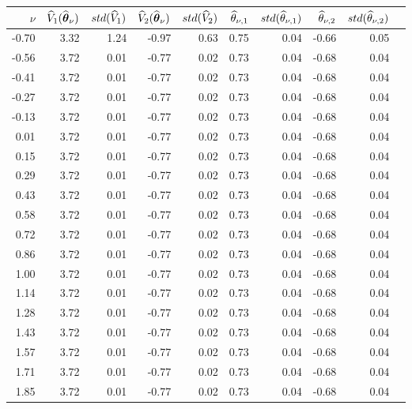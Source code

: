 \begin{tabular}{rrrrrrrrrr}\hline 
 $\nu$  & $\widehat{V}_1(\widehat{\boldsymbol{\theta}}_{\nu})$ & $std(\widehat{V}_1)$ & $\widehat{V}_2(\widehat{\boldsymbol{\theta}}_{\nu})$ & $std(\widehat{V}_2)$ & $\widehat{\theta}_{\nu,1}$ & $std(\widehat{\theta}_{\nu,1})$ & $\widehat{\theta}_{\nu,2}$ & $std(\widehat{\theta}_{\nu,2})$ \\ \hline 
-0.70 &     3.32 &     1.24  &    -0.97 &      0.63 &      0.75 &      0.04 &     -0.66 &      0.05 \\ 
-0.56 &     3.72 &     0.01  &    -0.77 &      0.02 &      0.73 &      0.04 &     -0.68 &      0.04 \\ 
-0.41 &     3.72 &     0.01  &    -0.77 &      0.02 &      0.73 &      0.04 &     -0.68 &      0.04 \\ 
-0.27 &     3.72 &     0.01  &    -0.77 &      0.02 &      0.73 &      0.04 &     -0.68 &      0.04 \\ 
-0.13 &     3.72 &     0.01  &    -0.77 &      0.02 &      0.73 &      0.04 &     -0.68 &      0.04 \\ 
 0.01 &     3.72 &     0.01  &    -0.77 &      0.02 &      0.73 &      0.04 &     -0.68 &      0.04 \\ 
 0.15 &     3.72 &     0.01  &    -0.77 &      0.02 &      0.73 &      0.04 &     -0.68 &      0.04 \\ 
 0.29 &     3.72 &     0.01  &    -0.77 &      0.02 &      0.73 &      0.04 &     -0.68 &      0.04 \\ 
 0.43 &     3.72 &     0.01  &    -0.77 &      0.02 &      0.73 &      0.04 &     -0.68 &      0.04 \\ 
 0.58 &     3.72 &     0.01  &    -0.77 &      0.02 &      0.73 &      0.04 &     -0.68 &      0.04 \\ 
 0.72 &     3.72 &     0.01  &    -0.77 &      0.02 &      0.73 &      0.04 &     -0.68 &      0.04 \\ 
 0.86 &     3.72 &     0.01  &    -0.77 &      0.02 &      0.73 &      0.04 &     -0.68 &      0.04 \\ 
 1.00 &     3.72 &     0.01  &    -0.77 &      0.02 &      0.73 &      0.04 &     -0.68 &      0.04 \\ 
 1.14 &     3.72 &     0.01  &    -0.77 &      0.02 &      0.73 &      0.04 &     -0.68 &      0.04 \\ 
 1.28 &     3.72 &     0.01  &    -0.77 &      0.02 &      0.73 &      0.04 &     -0.68 &      0.04 \\ 
 1.43 &     3.72 &     0.01  &    -0.77 &      0.02 &      0.73 &      0.04 &     -0.68 &      0.04 \\ 
 1.57 &     3.72 &     0.01  &    -0.77 &      0.02 &      0.73 &      0.04 &     -0.68 &      0.04 \\ 
 1.71 &     3.72 &     0.01  &    -0.77 &      0.02 &      0.73 &      0.04 &     -0.68 &      0.04 \\ 
 1.85 &     3.72 &     0.01  &    -0.77 &      0.02 &      0.73 &      0.04 &     -0.68 &      0.04 \\ \hline 
\end{tabular}
